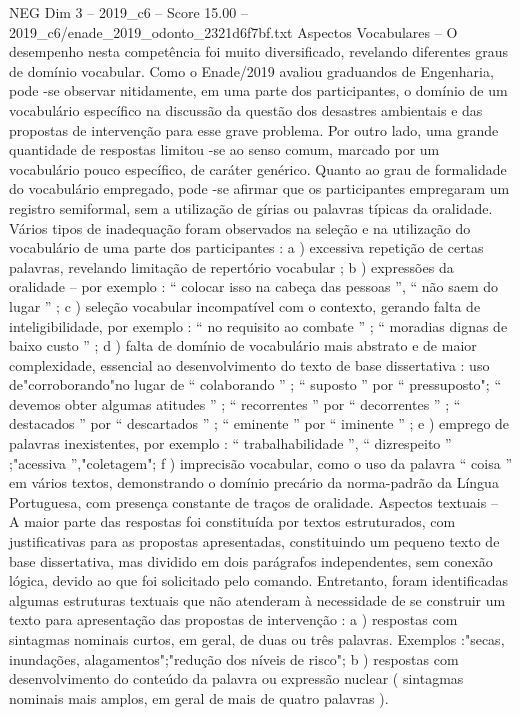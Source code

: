 \begin{textsample}{NEG Dim 3 – 2019\_c6 – Score 15.00 – 2019\_c6/enade\_2019\_odonto\_2321d6f7bf.txt}
Aspectos Vocabulares – O desempenho nesta competência foi muito diversificado, revelando diferentes graus de domínio vocabular.
Como o Enade/2019 avaliou graduandos de Engenharia, pode -se observar nitidamente, em uma parte dos participantes, o domínio de um vocabulário específico na discussão da questão dos desastres ambientais e das propostas de intervenção para esse grave problema.
Por outro lado, uma grande quantidade de respostas limitou -se ao senso comum, marcado por um vocabulário pouco específico, de caráter genérico.
Quanto ao grau de formalidade do vocabulário empregado, pode -se afirmar que os participantes empregaram um registro semiformal, sem a utilização de gírias ou palavras típicas da oralidade.
Vários tipos de inadequação foram observados na seleção e na utilização do vocabulário de uma parte dos participantes : a ) excessiva repetição de certas palavras, revelando limitação de repertório vocabular ; b ) expressões da oralidade – por exemplo : “ colocar isso na cabeça das pessoas ”, “ não saem do lugar ” ; c ) seleção vocabular incompatível com o contexto, gerando falta de inteligibilidade, por exemplo : “ no requisito ao combate ” ; “ moradias dignas de baixo custo ” ; d ) falta de domínio de vocabulário mais abstrato e de maior complexidade, essencial ao desenvolvimento do texto de base dissertativa : uso de"corroborando"no lugar de “ colaborando ” ; “ suposto ” por “ pressuposto"; “ devemos obter algumas atitudes ” ; “ recorrentes ” por “ decorrentes ” ; “ destacados ” por “ descartados ” ; “ eminente ” por “ iminente ” ; e ) emprego de palavras inexistentes, por exemplo : “ trabalhabilidade ”, “ dizrespeito ” ;"acessiva ”,"coletagem"; f ) imprecisão vocabular, como o uso da palavra “ coisa ” em vários textos, demonstrando o domínio precário da norma-padrão da Língua Portuguesa, com presença constante de traços de oralidade.
Aspectos textuais – A maior parte das respostas foi constituída por textos estruturados, com justificativas para as propostas apresentadas, constituindo um pequeno texto de base dissertativa, mas dividido em dois parágrafos independentes, sem conexão lógica, devido ao que foi solicitado pelo comando.
Entretanto, foram identificadas algumas estruturas textuais que não atenderam à necessidade de se construir um texto para apresentação das propostas de intervenção : a ) respostas com sintagmas nominais curtos, em geral, de duas ou três palavras.
Exemplos :"secas, inundações, alagamentos";"redução dos níveis de risco"; b ) respostas com desenvolvimento do conteúdo da palavra ou expressão nuclear ( sintagmas nominais mais amplos, em geral de mais de quatro palavras ).

\end{textsample}
